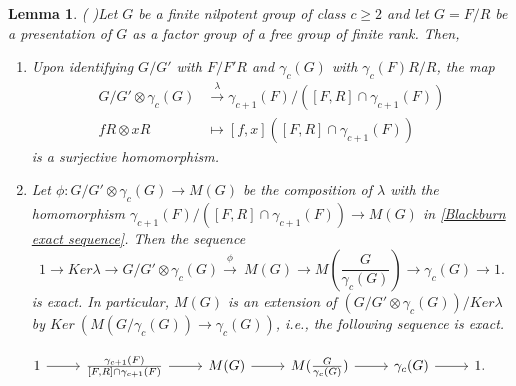 \documentclass[preprint,sort&compress,12pt]{elsarticle}
\newtheorem{lemma}[theorem]{Lemma}
\numberwithin{equation}{section}
\theoremstyle{definition}
\begin{document}
\begin{lemma}( \cite[Corollary 3.2.4]{Karp1987})\label{Karpilovsky lambda map}
    Let $G$ be a finite nilpotent group of class $c \geq 2$ and let $G=F/R$ be a presentation of $G$ as a factor group of a free group of finite rank. Then, 
    \begin{enumerate}
        \item [(i)] Upon identifying $G/G'$ with $F/F'R$ and $\gamma_c(G)$ with $\gamma_c(F)R/R$, the map
        \begin{align*}
            G/G' \otimes \gamma_c(G) &\xrightarrow{\lambda} \gamma_{c+1}(F)/([F,R] \cap \gamma_{c+1}(F)) \\
            fR \otimes xR &\mapsto [f,x]([F,R] \cap \gamma_{c+1}(F))
        \end{align*}
        is a surjective homomorphism.
        \item [(ii)] Let $\phi:G/G' \otimes \gamma_c(G) \to M(G)$ be the composition of $\lambda$ with the homomorphism $\gamma_{c+1}(F)/([F,R] \cap \gamma_{c+1}(F)) \to M(G)$ in \eqref{Blackburn exact sequence}. Then the sequence
            \begin{equation}\label{Blackburn exact sequence with X}
    1 \to Ker \lambda \to G/G' \otimes \gamma_c(G) \xrightarrow{\phi}\ M(G) \to M(\frac{G}{\gamma_c(G)}) \to \gamma_c(G) \to 1.
\end{equation}
is exact. In particular, $M(G)$ is an extension of $(G/G' \otimes \gamma_c(G))/Ker \lambda$ by $Ker \ (M(G/\gamma_c(G)) \to \gamma_c(G))$, i.e., the following sequence is exact.
    \end{enumerate}
    \[
\begin{tikzcd}
 1 \arrow[r] & \frac{\gamma_{c+1}(F)}{[F,R] \cap \gamma_{c+1}(F)} \arrow[r] & M(G) \arrow[r] & M(\frac{G}{\gamma_c(G)}) \arrow[r] & \gamma_c(G) \arrow[r] & 1.
\end{tikzcd}
\]
\end{lemma}
\end{document}
